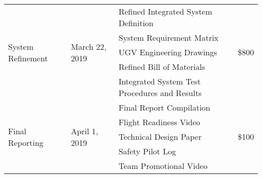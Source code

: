 \begin{center}
\begin{tabular}{|p{\colone}|p{\coltwo}|p{\colthree}|p{\colfour}|}
\multirow{5}{\colone}{System Refinement} & \multirow{5}{\coltwo}{March 22, 2019} & Refined Integrated System Definition & \multirow{5}{\colfour}{ \$800}\\
	&	& System Requirement Matrix&	\\
	&	& UGV Engineering Drawings&	\\
	&	& Refined Bill of Materials&	\\
	&	& Integrated System Test Procedures and Results &	\\ \hline

\multirow{5}{\colone}{Final Reporting} & \multirow{5}{\colone}{April 1, 2019} & Final Report Compilation& \multirow{5}{\colone}{\$100}\\
	&	& Flight Readiness Video&	\\
	&	&Technical Design Paper&	\\
	&	&Safety Pilot Log&	\\
	&	&Team Promotional Video& \\ \hline

  \hline
\end{tabular}

\end{center}
